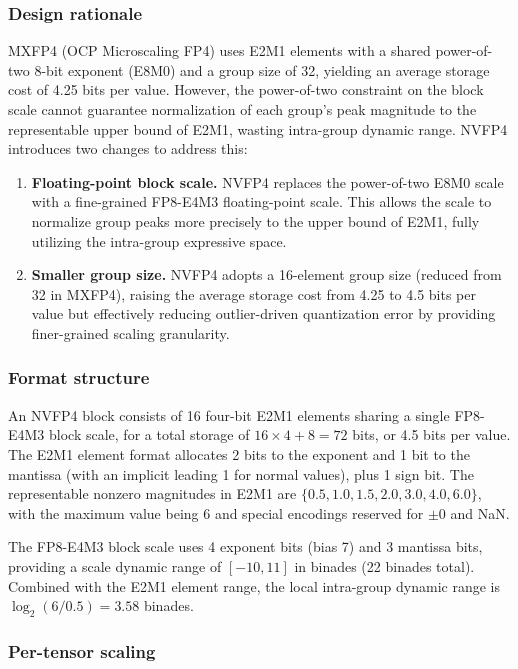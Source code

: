 \documentclass{article}
\begin{document}
\subsubsection{Design rationale}

MXFP4 (OCP Microscaling FP4) uses E2M1 elements with a shared power-of-two
8-bit exponent (E8M0) and a group size of 32, yielding an average storage cost
of 4.25 bits per value. However, the power-of-two constraint on the block scale
cannot guarantee normalization of each group's peak magnitude to the
representable upper bound of E2M1, wasting intra-group dynamic range. NVFP4
introduces two changes to address this:

\begin{enumerate}
\item \textbf{Floating-point block scale.} NVFP4 replaces the power-of-two
E8M0 scale with a fine-grained FP8-E4M3 floating-point scale. This allows the
scale to normalize group peaks more precisely to the upper bound of E2M1,
fully utilizing the intra-group expressive space.

\item \textbf{Smaller group size.} NVFP4 adopts a 16-element group size
(reduced from 32 in MXFP4), raising the average storage cost from 4.25 to 4.5
bits per value but effectively reducing outlier-driven quantization error by
providing finer-grained scaling granularity.
\end{enumerate}

\subsubsection{Format structure}

An NVFP4 block consists of 16 four-bit E2M1 elements sharing a single FP8-E4M3
block scale, for a total storage of $16 \times 4 + 8 = 72$ bits, or 4.5 bits
per value. The E2M1 element format allocates 2 bits to the exponent and 1 bit
to the mantissa (with an implicit leading 1 for normal values), plus 1 sign
bit. The representable nonzero magnitudes in E2M1 are
$\{0.5, 1.0, 1.5, 2.0, 3.0, 4.0, 6.0\}$, with the maximum value being 6 and
special encodings reserved for $\pm 0$ and NaN.

The FP8-E4M3 block scale uses 4 exponent bits (bias 7) and 3 mantissa bits,
providing a scale dynamic range of $[-10, 11]$ in binades (22 binades total).
Combined with the E2M1 element range, the local intra-group dynamic range is
$\log_2(6/0.5) = 3.58$ binades.

\subsubsection{Per-tensor scaling}
\end{document}
